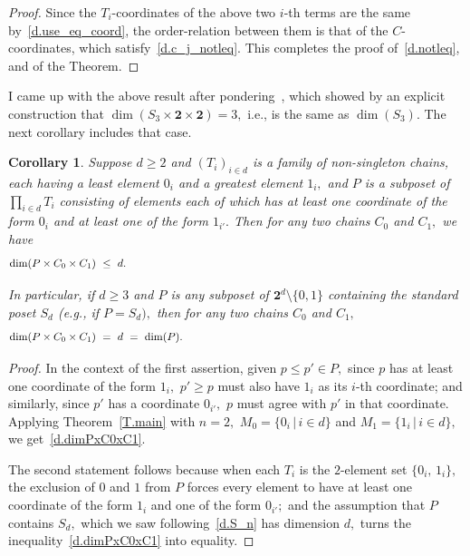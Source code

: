 \documentclass{amsart}
\newtheorem{corollary}[theorem]{Corollary}
\numberwithin{equation}{section}
\numberwithin{theorem}{section}
\newcommand{\2}{\mathbf{2}}
\begin{document}
\begin{proof}
Since the $\!T_i\!$-coordinates of the above two $\!i\!$-th terms
are the same by~\eqref{d.use_eq_coord}, the order-relation
between them is
that of the $\!C\!$-coordinates, which satisfy~\eqref{d.c_j_notleq}.
This completes the proof of~\eqref{d.notleq}, and of the Theorem.
\end{proof}

I came up with the above result after pondering~\cite{S3x2x2},
which showed by an explicit construction that
$\dim(S_3\times \2\times \2) = 3,$ i.e., is the same as $\dim(S_3).$
The next corollary includes that case.

\begin{corollary}\label{C.0&1}
Suppose $d\geq 2$ and $(T_i)_{i\in d}$ is a family of non-singleton
chains, each having a least element $0_i$ and a greatest element $1_i,$
and $P$ is a subposet of $\prod_{i\in d} T_i$ consisting of
elements each of which has at least one coordinate of
the form $0_i$ and at least one of the form $1_{i'}.$
Then for any two chains $C_0$ and $C_1,$ we have
%
\begin{equation}\begin{minipage}[c]{35pc}\label{d.dimPxC0xC1}
$\dim(P\times C_0\times C_1)\ \leq\ d.$
\end{minipage}\end{equation}

In particular, if $d\geq 3$
and $P$ is any subposet of $\2^d\setminus \{0,1\}$
containing the standard poset $S_d$ \textup{(}e.g., if $P=S_d),$
then for any two chains $C_0$ and $C_1,$
%
\begin{equation}\begin{minipage}[c]{35pc}\label{d.dim=d=dim}
$\dim(P\times C_0\times C_1)\ =\ d\ =\ \dim(P).$
\end{minipage}\end{equation}
%
\end{corollary}

\begin{proof}
In the context of the first assertion,
given $p\leq p'\in P,$ since $p$ has
at least one coordinate of the form $1_i,$
$p'\geq p$ must also
have $1_i$ as its $\!i\!$-th coordinate; and similarly,
since $p'$ has a coordinate $0_{i'},$ $p$ must agree with
$p'$ in that coordinate.
Applying Theorem~\ref{T.main} with $n=2,$ $M_0=\{0_i\,|\,i\in d\}$
and $M_1=\{1_i\,|\,i\in d\},$ we get~\eqref{d.dimPxC0xC1}.

The second statement follows because when each $T_i$ is
the $\!2\!$-element set $\{0_i,\,1_i\},$ the exclusion
of $0$ and $1$ from $P$ forces every element
to have at least one coordinate of
the form $1_i$ and one of the form $0_{i'};$
and the assumption that $P$ contains $S_d,$ which
we saw following~\eqref{d.S_n} has dimension $d,$ turns the
inequality~\eqref{d.dimPxC0xC1} into equality.
\end{proof}
\end{document}
